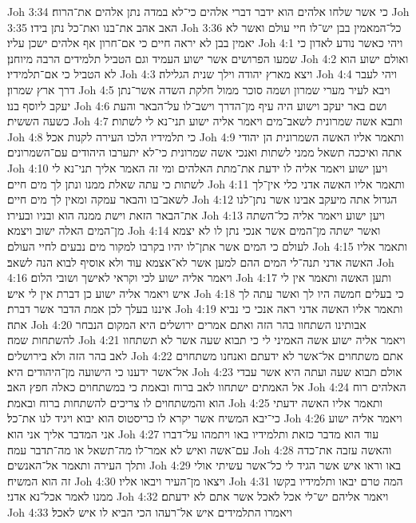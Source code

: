 Joh 3:34  כי אשר שלחו אלהים הוא ידבר דברי אלהים כי־לא במדה נתן אלהים את־הרוח׃
Joh 3:35  האב אהב את־בנו ואת־כל נתן בידו׃
Joh 3:36  כל־המאמין בבן יש־לו חיי עולם ואשר לא יאמין בבן לא יראה חיים כי אם־חרון אף אלהים ישכן עליו׃
Joh 4:1  ויהי כאשר נודע לאדון כי שמעו הפרושים אשר ישוע העמיד וגם הטביל תלמידים הרבה מיוחנן׃
Joh 4:2  ואולם ישוע הוא לא הטביל כי אם־תלמידיו׃
Joh 4:3  ויצא מארץ יהודה וילך שנית הגלילה׃
Joh 4:4  ויהי לעבר דרך ארץ שמרון׃
Joh 4:5  ויבא לעיר מערי שמרון ושמה סוכר ממול חלקת השדה אשר־נתן יעקב ליוסף בנו׃
Joh 4:6  ושם באר יעקב וישוע היה עיף מן־הדרך וישב־לו על־הבאר והעת כשעה הששית׃
Joh 4:7  ותבא אשה שמרונית לשאב־מים ויאמר אליה ישוע תני־נא לי לשתות׃
Joh 4:8  כי תלמידיו הלכו העירה לקנות אכל׃
Joh 4:9  ותאמר אליו האשה השמרונית הן יהודי אתה ואיככה תשאל ממני לשתות ואנכי אשה שמרונית כי־לא יתערבו היהודים עם־השמרונים׃
Joh 4:10  ויען ישוע ויאמר אליה לו ידעת את־מתת האלהים ומי זה האמר אליך תני־נא לי לשתות כי עתה שאלת ממנו ונתן לך מים חיים׃
Joh 4:11  ותאמר אליו האשה אדני כלי אין־לך לשאב־בו והבאר עמקה ומאין לך מים חיים׃
Joh 4:12  הגדול אתה מיעקב אבינו אשר נתן־לנו את־הבאר הזאת וישת ממנה הוא ובניו ובעירו׃
Joh 4:13  ויען ישוע ויאמר אליה כל־השתה מן־המים האלה ישוב ויצמא׃
Joh 4:14  ואשר ישתה מן־המים אשר אנכי נתן לו לא יצמא לעולם כי המים אשר אתן־לו יהיו בקרבו למקור מים נבעים לחיי העולם׃
Joh 4:15  ותאמר אליו האשה אדני תנה־לי המים ההם למען אשר לא־אצמא עוד ולא אוסיף לבוא הנה לשאב׃
Joh 4:16  ויאמר אליה ישוע לכי וקראי לאישך ושובי הלום׃
Joh 4:17  ותען האשה ותאמר אין לי איש ויאמר אליה ישוע כן דברת אין לי איש׃
Joh 4:18  כי בעלים חמשה היו לך ואשר עתה לך איננו בעלך לכן אמת הדבר אשר דברת׃
Joh 4:19  ותאמר אליו האשה אדני ראה אנכי כי נביא אתה׃
Joh 4:20  אבותינו השתחוו בהר הזה ואתם אמרים ירושלים היא המקום הנבחר להשתחות שמה׃
Joh 4:21  ויאמר אליה ישוע אשה האמיני לי כי תבוא שעה אשר לא תשתחוו לאב בהר הזה ולא בירושלים׃
Joh 4:22  אתם משתחוים אל־אשר לא ידעתם ואנחנו משתחוים אל־אשר ידענו כי הישועה מן־היהודים היא׃
Joh 4:23  אולם תבוא שעה ועתה היא אשר עבדי אל האמתים ישתחוו לאב ברוח ובאמת כי במשתחוים כאלה חפץ האב׃
Joh 4:24  האלהים רוח הוא והמשתחוים לו צריכים להשתחות ברוח ובאמת׃
Joh 4:25  ותאמר אליו האשה ידעתי כי־יבא המשיח אשר יקרא לו כריסטוס הוא יבוא ויגיד לנו את־כל׃
Joh 4:26  ויאמר אליה ישוע אני המדבר אליך אני הוא׃
Joh 4:27  עוד הוא מדבר כזאת ותלמידיו באו ויתמהו על־דברו עם־אשה ואיש לא אמר־לו מה־תשאל או מה־תדבר עמה׃
Joh 4:28  והאשה עזבה את־כדה ותלך העירה ותאמר אל־האנשים׃
Joh 4:29  באו וראו איש אשר הגיד לי כל־אשר עשיתי אולי זה הוא המשיח׃
Joh 4:30  ויצאו מן־העיר ויבאו אליו׃
Joh 4:31  המה טרם יבאו ותלמידיו בקשו ממנו לאמר אכל־נא אדני׃
Joh 4:32  ויאמר אליהם יש־לי אכל לאכל אשר אתם לא ידעתם׃
Joh 4:33  ויאמרו התלמידים איש אל־רעהו הכי הביא לו איש לאכל׃
